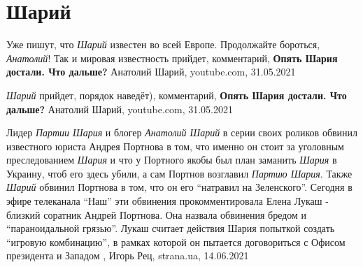  
 
 
 
 
\chapter{Шарий}
\label{sec:slova.sharij}

Уже пишут, что \emph{Шарий} известен во всей Европе. Продолжайте  бороться, \emph{Анатолий}!  Так и мировая известность прийдет,
комментарий, \textbf{Опять Шария достали. Что дальше?} Анатолий Шарий, youtube.com, 31.05.2021

\emph{Шарий} прийдет, порядок наведёт),
комментарий, \textbf{Опять Шария достали. Что дальше?} Анатолий Шарий, youtube.com, 31.05.2021

Лидер \emph{Партии Шария} и блогер \emph{Анатолий Шарий} в серии своих роликов
обвинил известного юриста Андрея Портнова в том, что именно он стоит за
уголовным преследованием \emph{Шария} и что у Портного якобы был план заманить
\emph{Шария} в Украину, чтоб его здесь убили, а сам Портнов возглавил
\emph{Партию Шария}. Также \emph{Шарий} обвинил Портнова в том, что он его
\enquote{натравил на Зеленского}.  Сегодня в эфире телеканала \enquote{Наш} эти
обвинения прокомментировала Елена Лукаш - близкий соратник Андрей Портнова. Она
назвала обвинения бредом и \enquote{параноидальной грязью}. Лукаш считает
действия Шария попыткой создать \enquote{игровую комбинацию}, в рамках которой
он пытается договориться с Офисом президента и Западом
, 
Игорь Рец, strana.ua, 14.06.2021

